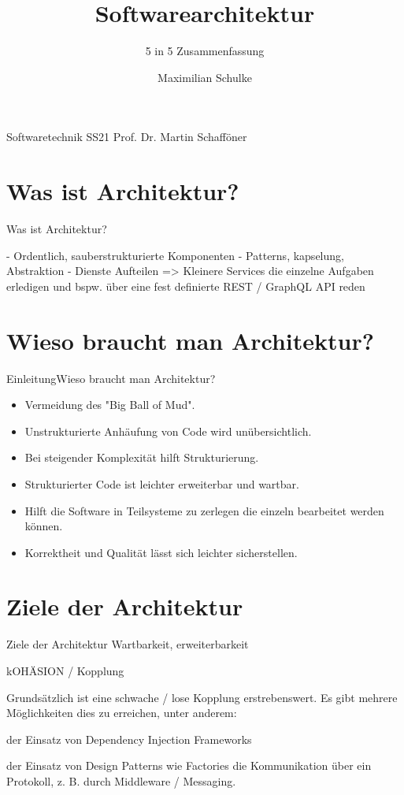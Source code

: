 \documentclass{beamer}
\title{Softwarearchitektur}
\subtitle{5 in 5 Zusammenfassung}
\author{Maximilian Schulke}
\begin{document}
\begin{frame}
	Softwaretechnik \hfill SS21
	\titlepage
	Prof. Dr. Martin Schafföner
\end{frame}

\section{Was ist Architektur?}

\begin{frame}{Was ist Architektur?}

	- Ordentlich, sauberstrukturierte Komponenten
	- Patterns, kapselung, Abstraktion
	- Dienste Aufteilen => Kleinere Services die einzelne Aufgaben erledigen und bspw. über eine fest definierte REST / GraphQL API reden
\end{frame}

\section{Wieso braucht man Architektur?}

\begin{frame}{Einleitung}{Wieso braucht man Architektur?}

	\begin{itemize}
		\item Vermeidung des "Big Ball of Mud".
		\item Unstrukturierte Anhäufung von Code wird unübersichtlich.
		\item Bei steigender Komplexität hilft Strukturierung.
		\item Strukturierter Code ist leichter erweiterbar und wartbar.
		\item Hilft die Software in Teilsysteme zu zerlegen die einzeln bearbeitet werden können.
		\item Korrektheit und Qualität lässt sich leichter sicherstellen.
	\end{itemize}
\end{frame}

\section{Ziele der Architektur}

\begin{frame}{Ziele der Architektur}
	Wartbarkeit, erweiterbarkeit

	kOHÄSION / Kopplung

	Grundsätzlich ist eine schwache / lose Kopplung erstrebenswert. Es gibt mehrere Möglichkeiten dies zu erreichen, unter anderem:

	der Einsatz von Dependency Injection Frameworks

	der Einsatz von Design Patterns wie Factories
	die Kommunikation über ein Protokoll, z. B. durch Middleware / Messaging.
\end{frame}
\end{document}
